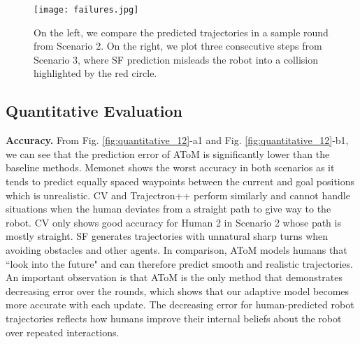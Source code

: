 \begin{figure*}[ht]
    \centering
    \texttt{[image: failures.jpg]}
    \vspace{-5mm}
    \caption{On the left, we compare the predicted trajectories in a sample round from Scenario 2. On the right, we plot three consecutive steps from Scenario 3, where SF prediction misleads the robot into a collision highlighted by the red circle.}
    \label{fig:failures}
\end{figure*}


\subsection{Quantitative Evaluation}
\textbf{Accuracy.}
From Fig. \ref{fig:quantitative_12}-a1 and Fig. \ref{fig:quantitative_12}-b1, we can see that the prediction error of AToM is significantly lower than the baseline methods. 
Memonet shows the worst accuracy in both scenarios as it tends to predict equally spaced waypoints between the current and goal positions which is unrealistic.
CV and Trajectron++ perform similarly and cannot handle situations when the human deviates from a straight path to give way to the robot. CV only shows good accuracy for Human 2 in Scenario 2 whose path is mostly straight. 
SF generates trajectories with unnatural sharp turns when avoiding obstacles and other agents. 
In comparison, AToM models humans that ``look into the future" and can therefore predict smooth and realistic trajectories. 
An important observation is that AToM is the only method that demonstrates decreasing error over the rounds, which shows that our adaptive model becomes more accurate with each update. The decreasing error for human-predicted robot trajectories reflects how humans improve their internal beliefs about the robot over repeated interactions.

